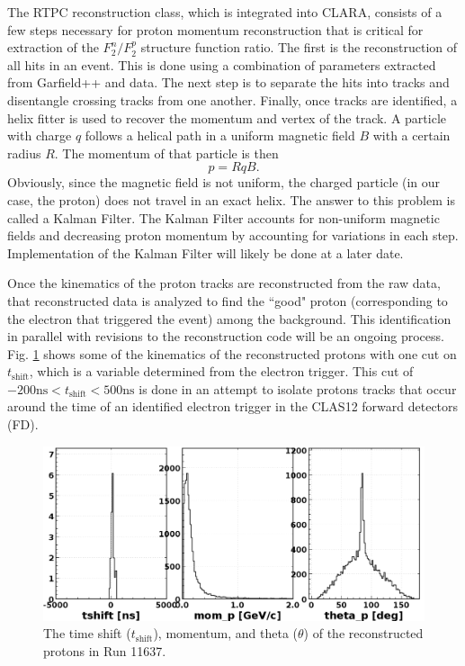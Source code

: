 The RTPC reconstruction class, which is integrated into CLARA, consists of a few steps necessary for proton momentum reconstruction that is critical for extraction of the $F_2^n/F_2^p$ structure function ratio. The first is the reconstruction of all hits in an event. This is done using a combination of parameters extracted from Garfield++ and data. The next step is to separate the hits into tracks and disentangle crossing tracks from one another. Finally, once tracks are identified, a helix fitter is used to recover the momentum and vertex of the track. A particle with charge $q$ follows a helical path in a uniform magnetic field $B$ with a certain radius $R$. The momentum of that particle is then
\begin{equation}
p = RqB.
\end{equation}
Obviously, since the magnetic field is not uniform, the charged particle (in our case, the proton) does not travel in an exact helix. The answer to this problem is called a Kalman Filter. The Kalman Filter accounts for non-uniform magnetic fields and decreasing proton momentum by accounting for variations in each step. Implementation of the Kalman Filter will likely be done at a later date.

Once the kinematics of the proton tracks are reconstructed from the raw data, that reconstructed data is analyzed to find the ``good" proton (corresponding to the electron that triggered the event) among the background. This identification in parallel with revisions to the reconstruction code will be an ongoing process. Fig. \ref{fig:rgf_pkin} shows some of the kinematics of the reconstructed protons with one cut on $t_{\mathrm{shift}}$, which is a variable determined from the electron trigger. This cut of $-200 \mathrm{ns} < t_{\mathrm{shift}} < 500 \mathrm{ns}$ is done in an attempt to isolate protons tracks that occur around the time of an identified electron trigger in the CLAS12 forward detectors (FD).

\begin{figure}[h!]
	\centering
	\includegraphics[width=0.9\linewidth]{figures/rgf/11637/pkinematics.png}
	\caption{The time shift ($t_{\mathrm{shift}}$), momentum, and theta ($\theta$) of the reconstructed protons in Run 11637.}
	\label{fig:rgf_pkin}
\end{figure}

